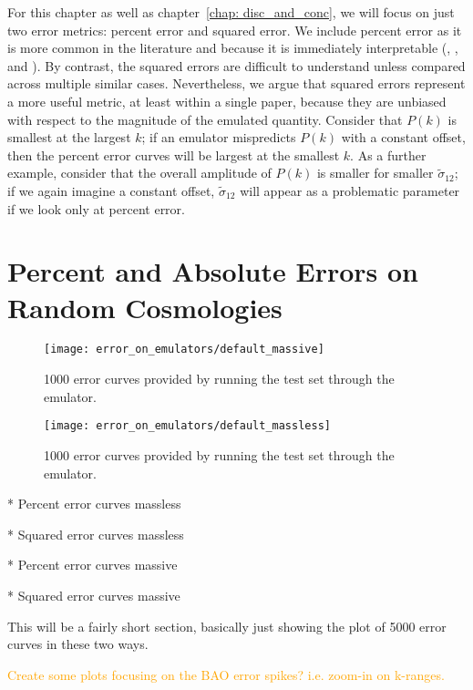For this chapter as well as chapter~\ref{chap: disc_and_conc}, we will focus
on just two error metrics: percent error and squared error. We include percent
error as it is more common in the literature and because it is immediately
interpretable (\citealp{Mancini}, \citealp{Arico}, and
\citealp{Eggemeier}). By contrast, the squared errors are difficult to
understand unless compared across multiple similar cases.
Nevertheless, we argue
that squared errors represent a more useful metric, at least within a single
paper, because they are unbiased with respect to the magnitude of the emulated
quantity. Consider that $P(k)$ is smallest at the largest $k$; if an emulator
mispredicts $P(k)$ with a constant offset, then the percent error curves will
be largest at the smallest $k$. As a further example, consider that the
overall amplitude of $P(k)$ is smaller for smaller $\tilde{\sigma}_{12}$;
if we again imagine a constant offset, $\tilde{\sigma}_{12}$ will appear as a
problematic parameter if we look only at percent error.


\section{Percent and Absolute Errors on Random Cosmologies}

\begin{figure}[ht!]
  \centering
  \texttt{[image: error\_on\_emulators/default\_massive]}
  \caption[Default Massive Emulator Performance]{1000 error curves provided by running the test set through the emulator.}
  \label{fig: def_massive_errs}
\end{figure}

\begin{figure}[ht!]
  \centering
  \texttt{[image: error\_on\_emulators/default\_massless]}
  \caption[Default Massless Emulator Performance]{1000 error curves provided by running the test set through the emulator.}
  \label{fig: def_massless_errs}
\end{figure}


* Percent error curves massless

* Squared error curves massless

* Percent error curves massive

* Squared error curves massive

This will be a fairly short section, basically just showing the plot of 5000 
error curves in these two ways.

\textcolor{orange}{Create some plots focusing on the BAO error spikes? i.e.
zoom-in on k-ranges.}

